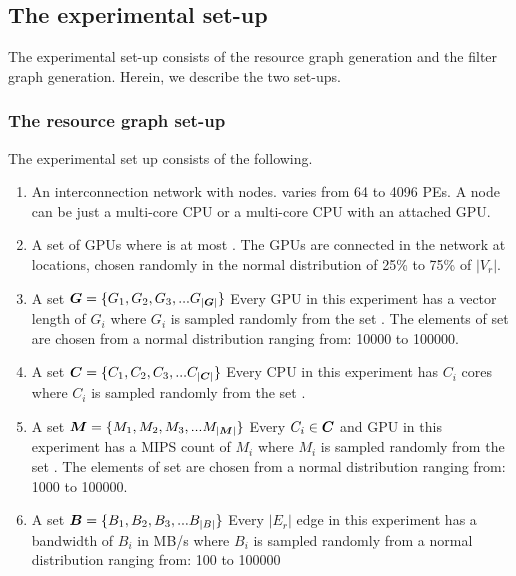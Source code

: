 \subsection{The experimental set-up}
\label{sec:experimental-setup}

The experimental set-up consists of the resource graph generation and the
filter graph generation. Herein, we describe the two set-ups.

\subsubsection{The resource graph set-up}
\label{sec:resource-graph-setup}

The experimental set up consists of the following.

\begin{enumerate}

\item An interconnection network with \numtplgynodes
  nodes. \numtplgynodes varies from 64 to 4096 PEs. A node can be just a
  multi-core CPU or a multi-core CPU with an attached GPU.

\item A set of \gpunum GPUs where \gpunum is at most \numtplgynodes. The
  GPUs are connected in the network at locations, chosen randomly in the
  normal distribution of 25\% to 75\% of $|V_r|$.

\item A set $\bm{G} = \{G_1, G_2, G_3, ... G_{|\bm{G}|}\}$
  Every GPU in this experiment has a vector
  length of $G_i$ where $G_i$ is sampled randomly from the set
  \veclenset. The elements of set \veclenset are chosen from a normal
  distribution ranging from: 10000 to 100000.

\item A set $\bm{C} = \{C_1, C_2, C_3, ... C_{|\bm{C}|}\}$
  Every CPU in this experiment has $C_i$
  cores where $C_i$ is sampled randomly from the set \corenumset.

\item A set $\bm{M} = \{M_1, M_2, M_3, ... M_{|\bm{M}|}\}$
   Every $C_i \in \bm{C}$ and GPU in this
  experiment has a MIPS count of $M_i$ where $M_i$ is sampled randomly
  from the set \mipsset. The elements of set \mipsset are chosen from a
  normal distribution ranging from: 1000 to 100000.

\item A set $\bm{B} = \{B_1, B_2, B_3, ... B_{|B|}\}$
  Every $|E_r|$ edge in this experiment has a bandwidth of $B_i$ in MB/s where $B_i$
  is sampled randomly from a normal distribution ranging from: 100 to 100000

\end{enumerate}

